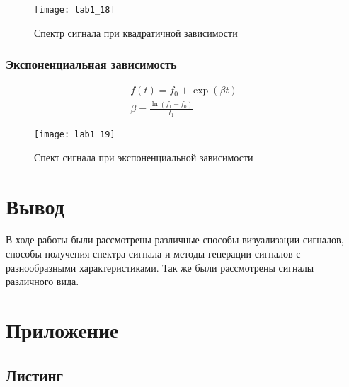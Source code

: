 \begin{figure}[H]
	\begin{center}
		\texttt{[image: lab1\_18]}
		\caption{Спектр сигнала при квадратичной зависимости} 
		\label{pic:lab1_18} %
	\end{center}
\end{figure}


\subsubsection{Экспоненциальная зависимость}

\begin{eqnarray}
f(t) = f_0 + \exp(\beta t) \\
\beta = \frac{\ln(f_1-f_0)}{t_1}
\end{eqnarray}

\begin{figure}[H]
	\begin{center}
		\texttt{[image: lab1\_19]}
		\caption{Спект сигнала при экспоненциальной зависимости} 
		\label{pic:lab1_19} %
	\end{center}
\end{figure}

\section{Вывод}
В ходе работы были рассмотрены различные способы визуализации сигналов,
способы получения спектра сигнала и методы генерации сигналов с разнообразными 
характеристиками. Так же были рассмотрены сигналы различного вида.


\newpage
\section{Приложение}
\subsection{Листинг}
\makeatletter
\def\lst@PlaceNumber{\llap{\normalfont
                \lst@numberstyle{\the\lst@lineno}\kern\lst@numbersep}}
\makeatother


\parindent=1cm

